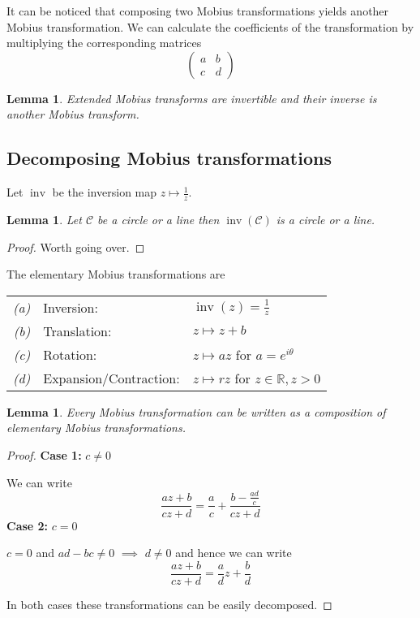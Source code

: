 \documentclass[11pt]{article}
\DeclareMathOperator{\inv}{\text{inv}}
\newcommand{\R}{\mathbb{R}}
\newenvironment{defin}
	{\begin{mdframed}[backgroundcolor=white, roundcorner=5pt, linewidth=1pt]}
	{\end{mdframed}}
\newcommand{\mdf}[1]{{\color{red} #1}}
\newtheorem{lemma}[theorem]{Lemma}
\begin{document}
It can be noticed that composing two Mobius transformations yields another Mobius transformation.
We can calculate the coefficients of the transformation by multiplying the corresponding matrices
\[
\begin{pmatrix}
	a & b \\
	c & d
\end{pmatrix}
\]
\begin{lemma}
Extended Mobius transforms are invertible and their inverse is another Mobius transform.
\end{lemma}

\subsection{Decomposing Mobius transformations}
Let $\inv$ be the inversion map $z\mapsto\frac{1}{z}$.
\begin{lemma}
Let $\mathcal{C}$ be a circle or a line then $\inv(\mathcal{C})$ is a circle or a line.
\end{lemma}
\begin{proof}
Worth going over.
\end{proof}

\begin{defin}
	The \mdf{elementary Mobius transformations} are
	
	\begin{tabular}{rll}
		\textit{(a)} & \mdf{Inversion}: & $\inv(z)=\frac{1}{z}$ \\
		\textit{(b)} & \mdf{Translation}: & $z\mapsto z+b$\\
		\textit{(c)} & \mdf{Rotation}: & $z\mapsto az$ for $a=e^{i\theta}$\\
		\textit{(d)} & \mdf{Expansion/Contraction}: & $z \mapsto rz$ for $z\in\R, z>0$
	\end{tabular}
\end{defin}

\begin{lemma}
Every Mobius transformation can be written as a composition of elementary Mobius transformations.
\end{lemma}

\begin{proof}
\textbf{Case 1:} $c\neq 0$

We can write 
\[
\frac{az+b}{cz+d}=\frac{a}{c}+\frac{b-\frac{ad}{c}}{cz+d}
\]
\textbf{Case 2:} $c=0$

$c=0$ and $ad-bc\neq 0$ $\implies$ $d\neq 0$ and hence we can write 
\[
\frac{az+b}{cz+d}=\frac{a}{d}z + \frac{b}{d}
\]

In both cases these transformations can be easily decomposed.
\end{proof}
\end{document}

